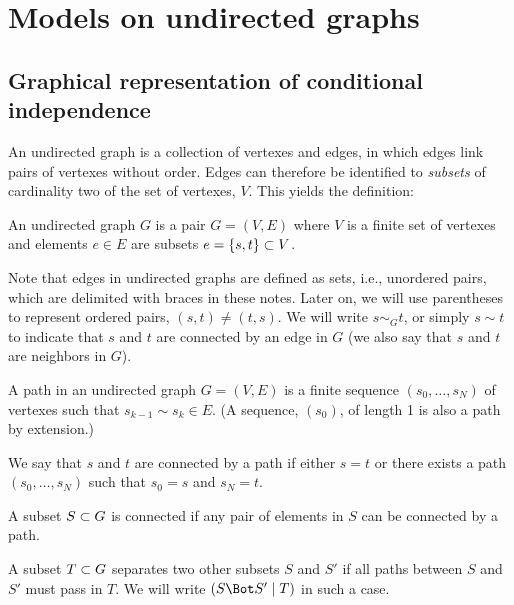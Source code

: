 \section{Models on undirected graphs}
\label{sec:random.fields}
\subsection{Graphical representation of conditional independence}
An undirected graph is a
collection of vertexes and edges, in which edges link pairs of  vertexes
without order. Edges can therefore be identified to {\em subsets} of cardinality two
of the set of vertexes, $V$. This yields the definition:
\begin{definition}
\label{def:undir.grph}
An undirected graph $G$ is a pair $G = (V,E)$ where $V$ is a finite
set of vertexes and elements $e \in E$ are subsets $e=\{s,t\} \subset V$.
\end{definition}
Note that edges in undirected graphs are defined as sets, i.e.,
unordered pairs, which are delimited with braces in these notes. Later
on, we will use parentheses to represent ordered pairs, $(s,t)\neq
(t,s)$. We will write $s\sim_G t$, or simply $s\sim t$ to indicate
that $s$ and $t$ are connected by an edge in $G$ (we also say that $s$
and $t$ are neighbors in $G$).

\begin{definition}
\label{def:path.undir}

A path in an undirected graph $G=(V,E)$ is a finite sequence $(s_0, \ldots,
s_N)$ of vertexes such that $s_{k-1}\sim s_k \in E$. (A sequence,
$(s_0)$, of length 1 is also a path by extension.)


We say that $s$ and $t$ are connected by a path if either $s=t$ or
there exists a path $(s_0, \ldots,
s_N)$ such that $s_0=s$ and $s_N=t$.

A subset $S\subset G$ is connected if any pair of elements in $S$ can be
connected by a path.

A subset $T\subset G$ separates two other subsets $S$ and $S'$ if all
paths between $S$ and $S'$ must  pass in $T$. We will write
$\cind{S}{S'}{T}$ in such a case. 


\end{definition}

